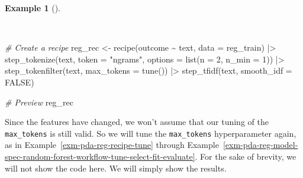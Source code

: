 \documentclass[
  letterpaper,
  DIV=11,
  numbers=noendperiod]{scrreprt}
\newenvironment{Shaded}{\begin{snugshade}}{\end{snugshade}}
\newcommand{\AttributeTok}[1]{\textcolor[rgb]{0.00,0.00,0.00}{#1}}
\newcommand{\CommentTok}[1]{\textcolor[rgb]{0.00,0.00,0.00}{\textit{#1}}}
\newcommand{\ConstantTok}[1]{\textcolor[rgb]{0.00,0.00,0.00}{#1}}
\newcommand{\DecValTok}[1]{\textcolor[rgb]{0.00,0.00,0.00}{#1}}
\newcommand{\FunctionTok}[1]{\textcolor[rgb]{0.00,0.00,0.00}{#1}}
\newcommand{\NormalTok}[1]{\textcolor[rgb]{0.00,0.00,0.00}{#1}}
\newcommand{\OtherTok}[1]{\textcolor[rgb]{0.00,0.00,0.00}{#1}}
\newcommand{\SpecialCharTok}[1]{\textcolor[rgb]{0.00,0.00,0.00}{#1}}
\newcommand{\StringTok}[1]{\textcolor[rgb]{0.00,0.00,0.00}{#1}}
\theoremstyle{definition}
\newtheorem{example}{Example}[chapter]
\theoremstyle{remark}
\begin{document}
\begin{example}[]\protect\hypertarget{exm-pda-reg-recipe-tfidf-bigrams}{}\label{exm-pda-reg-recipe-tfidf-bigrams}

~

\begin{Shaded}
\begin{Highlighting}[]
\CommentTok{\# Create a recipe}
\NormalTok{reg\_rec }\OtherTok{\textless{}{-}}
  \FunctionTok{recipe}\NormalTok{(outcome }\SpecialCharTok{\textasciitilde{}}\NormalTok{ text, }\AttributeTok{data =}\NormalTok{ reg\_train) }\SpecialCharTok{|\textgreater{}}
  \FunctionTok{step\_tokenize}\NormalTok{(text, }\AttributeTok{token =} \StringTok{"ngrams"}\NormalTok{, }\AttributeTok{options =} \FunctionTok{list}\NormalTok{(}\AttributeTok{n =} \DecValTok{2}\NormalTok{, }\AttributeTok{n\_min =} \DecValTok{1}\NormalTok{)) }\SpecialCharTok{|\textgreater{}}
  \FunctionTok{step\_tokenfilter}\NormalTok{(text, }\AttributeTok{max\_tokens =} \FunctionTok{tune}\NormalTok{()) }\SpecialCharTok{|\textgreater{}}
  \FunctionTok{step\_tfidf}\NormalTok{(text, }\AttributeTok{smooth\_idf =} \ConstantTok{FALSE}\NormalTok{)}

\CommentTok{\# Preview}
\NormalTok{reg\_rec}
\end{Highlighting}
\end{Shaded}

\end{example}

Since the features have changed, we won't assume that our tuning of the
\texttt{max\_tokens} is still valid. So we will tune the
\texttt{max\_tokens} hyperparameter again, as in
Example~\ref{exm-pda-reg-recipe-tune} through
Example~\ref{exm-pda-reg-model-spec-random-forest-workflow-tune-select-fit-evaluate}.
For the sake of brevity, we will not show the code here. We will simply
show the results.
\end{document}
